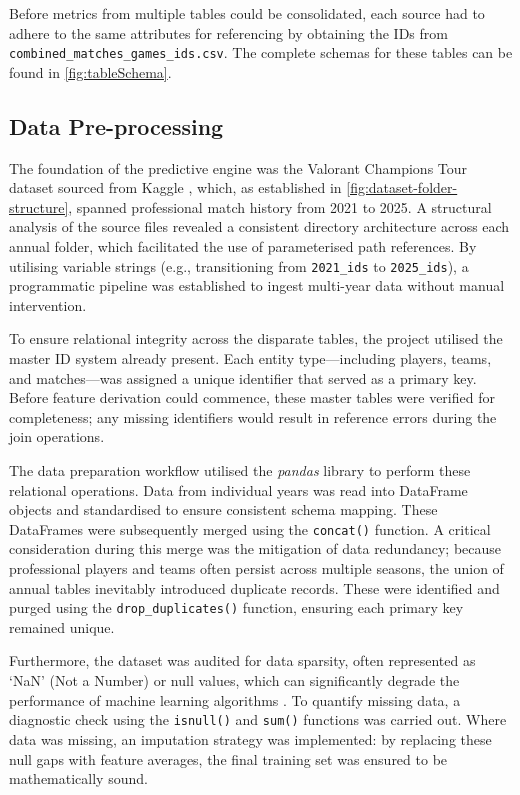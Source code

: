 Before metrics from multiple tables could be consolidated, each source had to adhere to the same attributes for referencing by obtaining the IDs from \texttt{combined_matches_games_ids.csv}. The complete schemas for these tables can be found in \autoref{fig:tableSchema}.

\subsection{Data Pre-processing}
The foundation of the predictive engine was the Valorant Champions Tour dataset sourced from Kaggle \cite{ryanluong_dataset}, which, as established in \autoref{fig:dataset-folder-structure}, spanned professional match history from 2021 to 2025. A structural analysis of the source files revealed a consistent directory architecture across each annual folder, which facilitated the use of parameterised path references. By utilising variable strings (e.g., transitioning from \texttt{2021_ids} to \texttt{2025_ids}), a programmatic pipeline was established to ingest multi-year data without manual intervention.

To ensure relational integrity across the disparate tables, the project utilised the master ID system already present. Each entity type---including players, teams, and matches---was assigned a unique identifier that served as a primary key. Before feature derivation could commence, these master tables were verified for completeness; any missing identifiers would result in reference errors during the join operations.

The data preparation workflow utilised the \textit{pandas} library \cite{pandas_site} to perform these relational operations. Data from individual years was read into DataFrame objects and standardised to ensure consistent schema mapping. These DataFrames were subsequently merged using the \texttt{concat()} function. A critical consideration during this merge was the mitigation of data redundancy; because professional players and teams often persist across multiple seasons, the union of annual tables inevitably introduced duplicate records. These were identified and purged using the \texttt{drop\_duplicates()} function, ensuring each primary key remained unique.

Furthermore, the dataset was audited for data sparsity, often represented as `NaN' (Not a Number) or null values, which can significantly degrade the performance of machine learning algorithms \cite{11226584}. To quantify missing data, a diagnostic check using the \texttt{isnull()} and \texttt{sum()} functions was carried out. Where data was missing, an imputation strategy was implemented: by replacing these null gaps with feature averages, the final training set was ensured to be mathematically sound.

